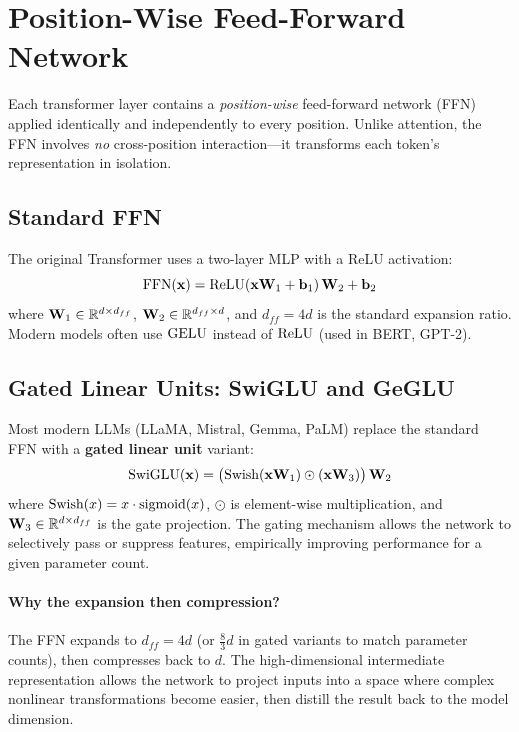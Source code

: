 \section{Position-Wise Feed-Forward Network}
\label{sec:ffn}

Each transformer layer contains a \emph{position-wise} feed-forward network
(FFN) applied identically and independently to every position.  Unlike
attention, the FFN involves \emph{no} cross-position interaction---it
transforms each token's representation in isolation.

\subsection{Standard FFN}

The original Transformer uses a two-layer MLP with a ReLU activation:
\[
    \text{FFN}(\mathbf{x}) = \operatorname{ReLU}(\mathbf{x} \mathbf{W}_1 + \mathbf{b}_1)\,\mathbf{W}_2 + \mathbf{b}_2
\]
where $\mathbf{W}_1 \in \mathbb{R}^{d \times d_{ff}}$, $\mathbf{W}_2 \in \mathbb{R}^{d_{ff} \times d}$,
and $d_{ff} = 4d$ is the standard expansion ratio.  Modern models often use
$\operatorname{GELU}$ instead of $\operatorname{ReLU}$ (used in BERT, GPT-2).

\subsection{Gated Linear Units: SwiGLU and GeGLU}

Most modern LLMs (LLaMA, Mistral, Gemma, PaLM) replace the standard FFN with
a \textbf{gated linear unit} variant:
\[
    \text{SwiGLU}(\mathbf{x}) = \bigl(\text{Swish}(\mathbf{x} \mathbf{W}_1) \odot (\mathbf{x} \mathbf{W}_3)\bigr)\,\mathbf{W}_2
\]
where $\text{Swish}(x) = x \cdot \operatorname{sigmoid}(x)$, $\odot$ is element-wise
multiplication, and $\mathbf{W}_3 \in \mathbb{R}^{d \times d_{ff}}$ is the gate projection.
The gating mechanism allows the network to selectively pass or suppress
features, empirically improving performance for a given parameter count.

\paragraph{Why the expansion then compression?}
The FFN expands to $d_{ff} = 4d$ (or $\tfrac{8}{3}d$ in gated variants to
match parameter counts), then compresses back to $d$.  The high-dimensional
intermediate representation allows the network to project inputs into a space
where complex nonlinear transformations become easier, then distill the result
back to the model dimension.


